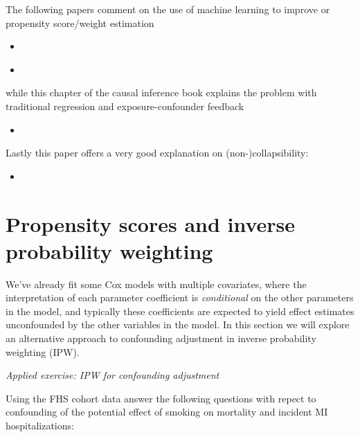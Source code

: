 \documentclass[
]{book}
\providecommand{\tightlist}{%
  \setlength{\itemsep}{0pt}\setlength{\parskip}{0pt}}
\begin{document}
The following papers comment on the use of machine learning to improve or propensity score/weight estimation

\begin{itemize}
\item
  \citet{lee2010improving}
\item
  \citet{westreich2010propensity}
\end{itemize}

while this chapter of the causal inference book explains the problem with traditional regression and exposure-confounder feedback

\begin{itemize}
\tightlist
\item
  \citet{hernanch20}
\end{itemize}

Lastly this paper offers a very good explanation on (non-)collapsibility:

\begin{itemize}
\tightlist
\item
  \citet{greenland1999confounding}
\end{itemize}

\hypertarget{propensity-scores-and-inverse-probability-weighting}{%
\section{Propensity scores and inverse probability weighting}\label{propensity-scores-and-inverse-probability-weighting}}

We've already fit some Cox models with multiple covariates, where the interpretation of each parameter coefficient is \emph{conditional} on the other parameters in the model, and typically these coefficients are expected to yield effect estimates unconfounded by the other variables in the model. In this section we will explore an alternative approach to confounding adjustment in inverse probability weighting (IPW).

\emph{Applied exercise: IPW for confounding adjustment}

Using the FHS cohort data answer the following questions with repect to confounding of the potential effect of smoking on mortality and incident MI hospitalizations:
\end{document}
